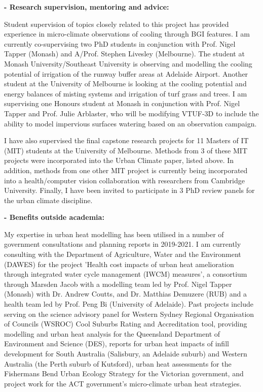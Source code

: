 \textbf{- Research supervision, mentoring and advice:}


Student supervision of topics closely related to this project has provided experience in micro-climate observations of cooling through BGI features. I am currently co-supervising two PhD students in conjunction with Prof. Nigel Tapper (Monash) and A/Prof. Stephen Livesley (Melbourne). The student at Monash University/Southeast University is observing and modelling the cooling potential of irrigation of the runway buffer areas at Adelaide Airport. Another student at the University of Melbourne is looking at the cooling potential and energy balances of misting systems and irrigation of turf grass and trees. I am supervising one Honours student at Monash in conjunction with Prof. Nigel Tapper and Prof. Julie Arblaster, who will be modifying VTUF-3D to include the ability to model impervious surfaces watering based on an observation campaign.

I have also supervised the final capstone research projects for 11 Masters of IT (MIT) students at the University of Melbourne. Methods from 3 of these MIT projects were incorporated into the Urban Climate paper, listed above. In addition, methods from one other MIT project is currently being incorporated into a health/computer vision collaboration with researchers from Cambridge University. Finally, I have been invited to participate in 3 PhD review panels for the urban climate discipline.



\textbf{- Benefits outside academia:}

My expertise in urban heat modelling has been utilised in a number of government consultations and planning reports in 2019-2021. I am currently consulting with the Department of Agriculture, Water and the Environment (DAWES) for the project 'Health cost impacts of urban heat amelioration through integrated water cycle management (IWCM) measures', a consortium through Marsden Jacob with a modelling team led by Prof. Nigel Tapper (Monash) with Dr. Andrew Coutts, and Dr. Matthias Demuzere (RUB) and a health team led by Prof. Peng Bi (University of Adelaide). Past projects include serving on the science advisory panel for Western Sydney Regional Organisation of Councils (WSROC) Cool Suburbs Rating and Accreditation tool, providing modelling and urban heat analysis for the Queensland Department of Environment and Science (DES), reports for urban heat impacts of infill development for South Australia (Salisbury, an Adelaide suburb) and Western Australia (the Perth suburb of Kutsford), urban heat assessments for the Fishermans Bend Urban Ecology Strategy for the Victorian government, and project work for the ACT government's micro-climate urban heat strategies.



